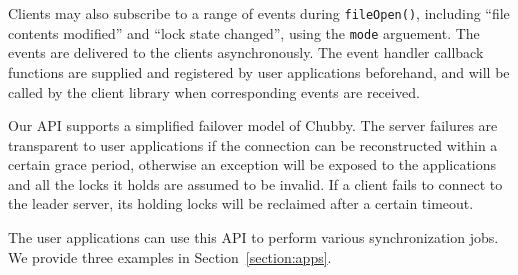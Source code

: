 Clients may also subscribe to a range of events during \texttt{fileOpen()},
including ``file contents modified'' and ``lock state changed'',
using the \texttt{mode} arguement.
The events are delivered to the clients asynchronously.
The event handler callback functions are supplied and registered by user
applications beforehand, and will be called by the client library when
corresponding events are received.

Our API supports a simplified failover model of Chubby. The server failures
are transparent to user applications if the connection can be reconstructed
within a certain grace period, otherwise an exception will be exposed to
the applications and all the locks it holds are assumed to be invalid.
If a client fails to connect to the leader server, its holding locks
will be reclaimed after a certain timeout.

The user applications can use this API to perform various synchronization
jobs. We provide three examples in Section~\ref{section:apps}.


